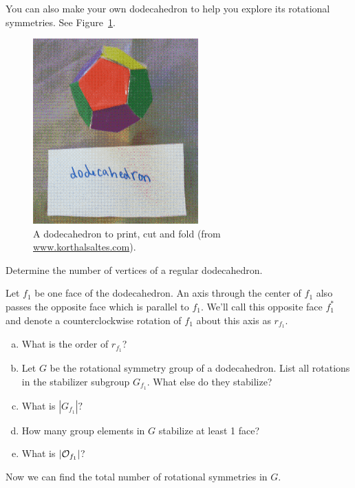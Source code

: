 You can also make your own dodecahedron to help you explore its rotational symmetries. See Figure~\ref{fig:DodecaFold}.

\begin{figure}[ht]
\begin{center}
\includegraphics[width=2.5in]{images/DodecahedronFold.png}
\caption{A dodecahedron to print, cut and fold (from \url{www.korthalsaltes.com}).}
 \label{fig:DodecaFold}
\end{center}
\end{figure}

\begin{exercise}\label{exercise:actions:Dodeca1}
Determine the number of vertices of a regular dodecahedron.
\end{exercise}
Let $f_1$ be one face of the dodecahedron.  An axis through the center of $f_1$ also passes the opposite face which is parallel to $f_1$. We'll call this opposite face $f_1^*$ and denote a counterclockwise rotation of $f_1$ about this axis as $r_{f_1}$.

\begin{exercise}\label{exercise:actions:Dodeca2}
\begin {enumerate}[(a)]
\item What is the order of $r_{f_1}$?
\item Let $G$ be the rotational symmetry group of a dodecahedron.  List all rotations in the stabilizer subgroup $G_{f_1}$.  What else do they stabilize?
\item What is $|G_{f_1}|?$
\item How many group elements in $G$ stabilize at least 1 face?
\item What is $|{\cal O}_{f_1}|$?
\end{enumerate}
\end{exercise}
Now we can find the total number of rotational symmetries in $G$.

